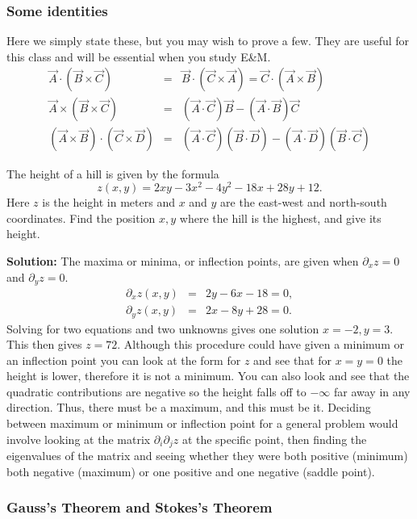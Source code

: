 \subsubsection*{Some identities}

Here we simply state these, but you may wish to prove a few. They are useful for this class and will be essential when you study E\&M.
\begin{eqnarray}
\vec{A}\cdot(\vec{B}\times\vec{C})&=&\vec{B}\cdot(\vec{C}\times\vec{A})=\vec{C}\cdot(\vec{A}\times\vec{B})\\
\nonumber
\vec{A}\times(\vec{B}\times\vec{C})&=&(\vec{A}\cdot\vec{C})\vec{B}-(\vec{A}\cdot\vec{B})\vec{C}\\
\nonumber
(\vec{A}\times\vec{B})\cdot(\vec{C}\times\vec{D})&=&(\vec{A}\cdot\vec{C})(\vec{B}\cdot\vec{D})
-(\vec{A}\cdot\vec{D})(\vec{B}\cdot\vec{C})
\end{eqnarray}



\example
The height of a hill is given by the formula 
\[
z(x,y)=2xy-3x^2-4y^2-18x+28y+12.
\]
Here $z$ is the height in meters and $x$ and $y$ are the east-west and north-south coordinates. Find the position $x,y$ where the hill is the highest, and give its height.

{\bf Solution:} The maxima or minima, or inflection points, are given when $\partial_x z=0$ and $\partial_yz=0$.
\begin{eqnarray*}
\partial_xz(x,y)&=&2y-6x-18=0,\\
\partial_yz(x,y)&=&2x-8y+28=0.
\end{eqnarray*}
Solving for two equations and two unknowns gives one solution $x=-2,y=3$. This then gives $z=72$. Although this procedure could have given a minimum or an inflection point you can look at the form for $z$ and see that for $x=y=0$ the height is lower, therefore it is not a minimum. You can also look and see that the quadratic contributions are negative so the height falls off to $-\infty$ far away in any direction. Thus, there must be a maximum, and this must be it. Deciding between maximum or minimum or inflection point for a general problem would involve looking at the matrix $\partial_i\partial_j z$ at the specific point, then finding the eigenvalues of the matrix and seeing whether they were both positive (minimum) both negative (maximum) or one positive and one negative (saddle point).

\exampleend

\subsubsection*{Gauss's Theorem and Stokes's Theorem}

